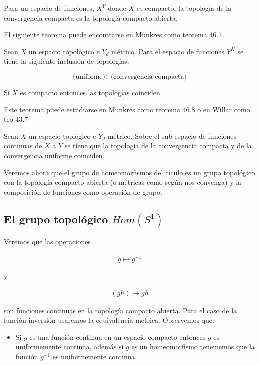 \begin{te}
Para un espacio de funciones, $X^Y$ donde $X$ es compacto, la topología de la convergencia compacta es la topología compacto abierta. 
\end{te}


El siguiente teorema puede encontrarse en Munkres como teorema 46.7

\begin{te}
Sean $X$ un espacio topológico e $Y_d $ métrico. Para el espacio de funciones $Y^X$ se tiene la siguiente inclusión de topologías:

$$\text{(uniforme)} \subset \text{(convergencia compacta)}$$ 

Si $X$ es compacto entonces las topologías coinciden. 
\end{te}

Este teorema puede estudiarse en Munkres como teorema 46.8 o en Willar como teo 43.7

\begin{te}
Sean $X$ un espacio toplógico e $Y_d $ métrico. Sobre el sub-espacio de funciones continuas de $X$ a $Y$ se tiene que la topología de la convergencia compacta y de la convergencia uniforme coinciden. 
\end{te}

Veremos ahora que el grupo de homeomorfismos del cículo es un grupo topológico con la topología compacto abierta (o métricas como según nos convenga) y la composición de funciones como operación de grupo.

\subsection*{El grupo topológico $Hom(S^1)$}

Veremos que las operaciones  

\begin{align*}
g \mapsto g^{-1}
\end{align*}

y 

\begin{align*}
(gh) \mapsto gh
\end{align*}

son funciones continuas en la topología compacto abierta. Para el caso de la función inversión usaremos la equivalencia métrica. Observemos que: 
\begin{itemize}
	\item Si $g$ es una función continua en un espacio compacto entonces $g$ es uniformemente continua, además si $g$ es un homeomorfismo tenememos que la función $g^{-1}$ es uniformemente continua. 
\end{itemize}

